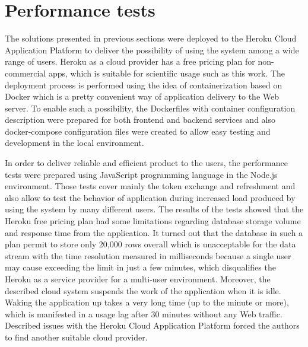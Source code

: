 \section{Performance tests}\label{sec:performance-tests}
The solutions presented in previous sections were deployed to the Heroku Cloud Application Platform to deliver the possibility of using the system among a wide range of users.
Heroku as a cloud provider has a free pricing plan for non-commercial apps, which is suitable for scientific usage such as this work.
The deployment process is performed using the idea of containerization based on Docker which is a pretty convenient way of application delivery to the Web server.
To enable such a possibility, the \mbox{Dockerfiles} with container configuration description were prepared for both frontend and backend services and also docker-compose configuration files were created to allow easy testing and development in the local environment.

In order to deliver reliable and efficient product to the users, the performance tests were prepared using JavaScript programming language in the Node.js environment.
Those tests cover mainly the token exchange and refreshment and also allow to test the behavior of application during increased load produced by using the system by many different users.
The results of the tests showed that the Heroku free pricing plan had some limitations regarding database storage volume and response time from the application.
It turned out that the database in such a plan permit to store only 20,000 rows overall which is unacceptable for the data stream with the time resolution measured in milliseconds because a single user may cause exceeding the limit in just a few minutes, which disqualifies the Heroku as a service provider for a multi-user environment.
Moreover, the described cloud system suspends the work of the application when it is idle.
Waking the application up takes a very long time (up to the minute or more), which is manifested in a usage lag after 30 minutes without any Web traffic.
Described issues with the Heroku Cloud Application Platform forced the authors to find another suitable cloud provider.
